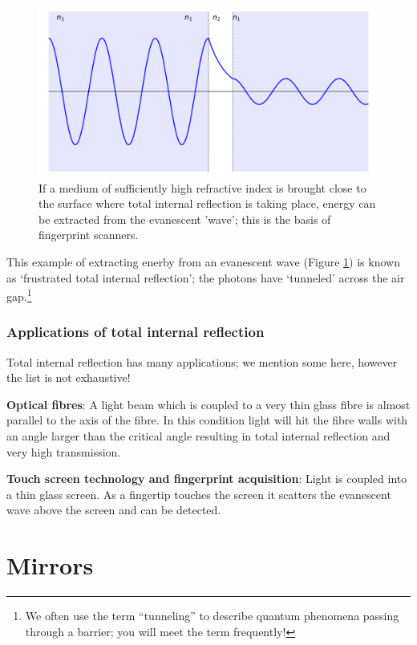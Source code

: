 \documentclass[
]{book}
\begin{document}
\begin{figure}

{\centering \includegraphics[width=0.7\linewidth]{visualisations/ch14-evansecent2} 

}

\caption{If a medium of sufficiently high refractive index is brought close to the surface where total internal reflection is taking place, energy can be extracted from the evanescent 'wave'; this is the basis of fingerprint scanners.}\label{fig:ch14-evanescentwave2}
\end{figure}

This example of extracting enerby from an evanescent wave (Figure \ref{fig:ch14-evanescentwave2}) is known as `frustrated total internal reflection'; the photons have `tunneled' across the air gap.\footnote{We often use the term ``tunneling'' to describe quantum phenomena passing through a barrier; you will meet the term frequently!}

\hypertarget{sec:ch14-tirapplications}{%
\subsection{Applications of total internal reflection}\label{sec:ch14-tirapplications}}

Total internal reflection has many applications; we mention some here, however the list is not exhaustive!

\textbf{Optical fibres}: A light beam which is coupled to a very thin glass fibre is almost parallel to the axis of the fibre. In this condition light will hit the fibre walls with an angle larger than the critical angle resulting in total internal reflection and very high transmission.

\textbf{Touch screen technology and fingerprint acquisition}: Light is coupled into a thin glass screen. As a fingertip touches the screen it scatters the evanescent wave above the screen and can be detected.

\hypertarget{sec:ch15-mirrors}{%
\chapter{Mirrors}\label{sec:ch15-mirrors}}
\end{document}
